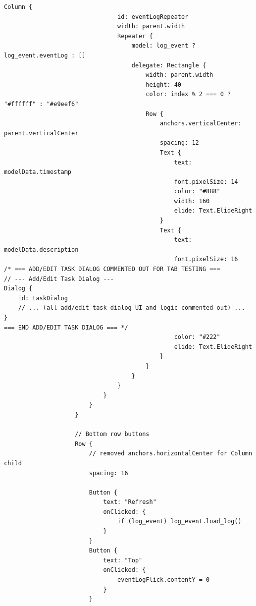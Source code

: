 \documentclass{report}
\begin{document}
\begin{lstlisting}[style=qmlstyle]
                            Column {
                                id: eventLogRepeater
                                width: parent.width
                                Repeater {
                                    model: log_event ? log_event.eventLog : []
                                    delegate: Rectangle {
                                        width: parent.width
                                        height: 40
                                        color: index % 2 === 0 ? "#ffffff" : "#e9eef6"
                                        Row {
                                            anchors.verticalCenter: parent.verticalCenter
                                            spacing: 12
                                            Text {
                                                text: modelData.timestamp
                                                font.pixelSize: 14
                                                color: "#888"
                                                width: 160
                                                elide: Text.ElideRight
                                            }
                                            Text {
                                                text: modelData.description
                                                font.pixelSize: 16
/* === ADD/EDIT TASK DIALOG COMMENTED OUT FOR TAB TESTING ===
// --- Add/Edit Task Dialog ---
Dialog {
    id: taskDialog
    // ... (all add/edit task dialog UI and logic commented out) ...
}
=== END ADD/EDIT TASK DIALOG === */
                                                color: "#222"
                                                elide: Text.ElideRight
                                            }
                                        }
                                    }
                                }
                            }
                        }
                    }

                    // Bottom row buttons
                    Row {
                        // removed anchors.horizontalCenter for Column child
                        spacing: 16

                        Button {
                            text: "Refresh"
                            onClicked: {
                                if (log_event) log_event.load_log()
                            }
                        }
                        Button {
                            text: "Top"
                            onClicked: {
                                eventLogFlick.contentY = 0
                            }
                        }
                    

\end{lstlisting}
\end{document}
